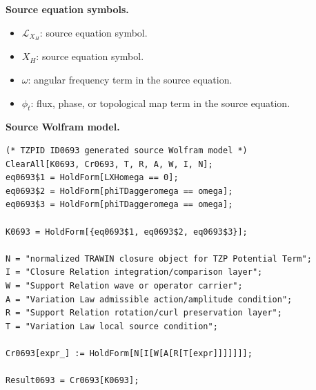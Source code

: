 \begin{minipage}[t]{0.49\linewidth}
\begingroup
\small
\raggedright
\textbf{Source equation symbols.}\par
\begin{itemize}[leftmargin=1.35em,itemsep=1pt,topsep=1pt,parsep=0pt]
    \item $\mathcal{L}_{X_H}$: source equation symbol.
    \item $X_H$: source equation symbol.
    \item $\omega$: angular frequency term in the source equation.
    \item $\phi_t$: flux, phase, or topological map term in the source equation.
\end{itemize}
\endgroup
\end{minipage}\hfill
\begin{minipage}[t]{0.47\linewidth}
\begingroup
\scriptsize
\raggedright
\textbf{Source Wolfram model.}\par
\begin{Verbatim}[fontsize=\tiny,breaklines=true,breakanywhere=true]
(* TZPID ID0693 generated source Wolfram model *)
ClearAll[K0693, Cr0693, T, R, A, W, I, N];
eq0693$1 = HoldForm[LXHomega == 0];
eq0693$2 = HoldForm[phiTDaggeromega == omega];
eq0693$3 = HoldForm[phiTDaggeromega == omega];

K0693 = HoldForm[{eq0693$1, eq0693$2, eq0693$3}];

N = "normalized TRAWIN closure object for TZP Potential Term";
I = "Closure Relation integration/comparison layer";
W = "Support Relation wave or operator carrier";
A = "Variation Law admissible action/amplitude condition";
R = "Support Relation rotation/curl preservation layer";
T = "Variation Law local source condition";

Cr0693[expr_] := HoldForm[N[I[W[A[R[T[expr]]]]]]];

Result0693 = Cr0693[K0693];
\end{Verbatim}
\endgroup
\end{minipage}

